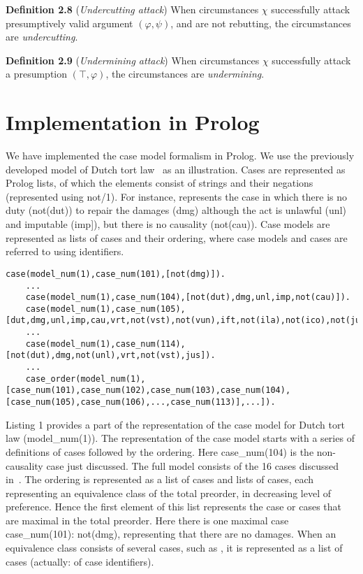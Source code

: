 \documentclass{IOS-Book-Article}
\begin{document}
\textbf{Definition 2.8} (\textit{Undercutting attack}) When circumstances $\chi$ successfully attack presumptively valid argument $(\varphi, \psi)$, and are not rebutting, the circumstances are \textit{undercutting}.

\textbf{Definition 2.9} (\textit{Undermining attack}) When circumstances $\chi$ successfully attack a presumption $(\top, \varphi)$, the circumstances are \textit{undermining}.

\section{Implementation in Prolog}
\noindent We have implemented the case model formalism in Prolog. We use the previously developed model of Dutch tort law~\cite{Verheij2017Formalizing} as an illustration. Cases are represented as Prolog lists, of which the elements consist of strings and their negations (represented using {\mf not/1}). For instance, {} represents the case in which there is no duty ({\mf not(dut)}) to repair the damages ({\mf dmg}) although the act is unlawful ({\mf unl}) and imputable ({\mf imp]}), but there is no causality ({\mf not(cau)}). Case models are represented as lists of cases and their ordering, where case models and cases are referred to using identifiers. 
	\begin{lstlisting}[caption={Definition of the Dutch tort law case model in Prolog},captionpos=b,float]
	case(model_num(1),case_num(101),[not(dmg)]).
	...
	case(model_num(1),case_num(104),[not(dut),dmg,unl,imp,not(cau)]).
	case(model_num(1),case_num(105),[dut,dmg,unl,imp,cau,vrt,not(vst),not(vun),ift,not(ila),not(ico),not(jus),prp]).
	...
	case(model_num(1),case_num(114),[not(dut),dmg,not(unl),vrt,not(vst),jus]).
	...
	case_order(model_num(1),[case_num(101),case_num(102),case_num(103),case_num(104),[case_num(105),case_num(106),...,case_num(113)],...]).
	\end{lstlisting}

Listing 1 provides a part of the representation of the case model for Dutch tort law ({\mf model\_num(1)}). 
The representation of the case model starts with a series of definitions of cases followed by the ordering. Here {\mf case\_num(104)} is the non-causality case just discussed. The full model consists of the 16 cases discussed in~\cite{Verheij2017Formalizing}. The ordering is represented as a list of cases and lists of cases, each representing an equivalence class of the total preorder, in decreasing level of preference. Hence the first element of this list represents the case or cases that are maximal in the total preorder. Here there is one maximal case {\mf case\_num(101): not(dmg)}, representing that there are no damages. When an equivalence class consists of several cases, such as {}, it is represented as a list of cases (actually: of case identifiers).
\end{document}

